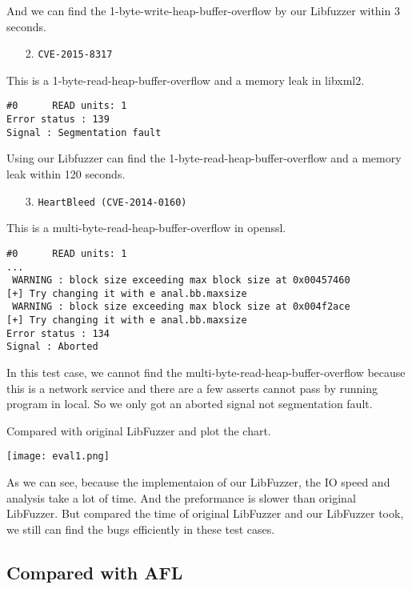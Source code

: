 And we can find the 1-byte-write-heap-buffer-overflow by our Libfuzzer within 3 seconds.

\begin{enumerate}
    \item [2.] \texttt{CVE-2015-8317}
\end{enumerate}

This is a 1-byte-read-heap-buffer-overflow and a memory leak in libxml2.

\begin{lstlisting}
#0      READ units: 1
Error status : 139
Signal : Segmentation fault
\end{lstlisting}

Using our Libfuzzer can find the 1-byte-read-heap-buffer-overflow and a memory leak within 120 seconds.

\begin{enumerate}
    \item [3.] \texttt{HeartBleed (CVE-2014-0160)}
\end{enumerate}

This is a multi-byte-read-heap-buffer-overflow in openssl.

\begin{lstlisting}
#0      READ units: 1
...
 WARNING : block size exceeding max block size at 0x00457460
[+] Try changing it with e anal.bb.maxsize
 WARNING : block size exceeding max block size at 0x004f2ace
[+] Try changing it with e anal.bb.maxsize
Error status : 134
Signal : Aborted
\end{lstlisting}

In this test case, we cannot find the multi-byte-read-heap-buffer-overflow because this is a network service and there are a few asserts cannot pass by running program in local. So we only got an aborted signal not segmentation fault.

Compared with original LibFuzzer and plot the chart.

\texttt{[image: eval1.png]}

As we can see, because the implementaion of our LibFuzzer, the IO speed and analysis take a lot of time. And the preformance is slower than original LibFuzzer. But compared the time of original LibFuzzer and our LibFuzzer took, we still can find the bugs efficiently in these test cases.

\subsection{Compared with AFL}


